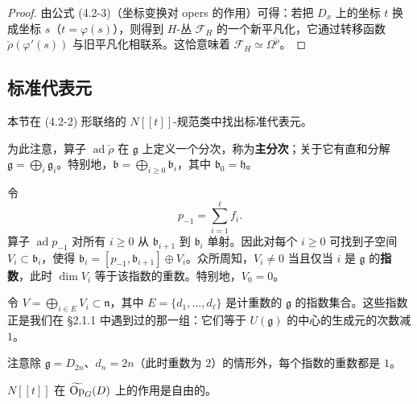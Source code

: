 \begin{proof}
由公式 (4.2-3)（坐标变换对 opers 的作用）可得：若把 $D_x$ 上的坐标 $t$ 换成坐标 $s$（$t=\varphi(s)$），则得到 $H$-丛 $\mathcal{F}_H$ 的一个新平凡化，它通过转移函数 $\check{\rho}(\varphi'(s))$ 与旧平凡化相联系。这恰意味着 $\mathcal{F}_H\simeq\Omega^{\check{\rho}}$。
\end{proof}

\subsection{标准代表元}

本节在 (4.2-2) 形联络的 $N[[t]]$-规范类中找出标准代表元。

为此注意，算子 $\operatorname{ad}\check{\rho}$ 在 $\mathfrak{g}$ 上定义一个分次，称为\textbf{主分次}；关于它有直和分解 $\mathfrak{g}=\bigoplus_i\mathfrak{g}_i$。特别地，$\mathfrak{b}=\bigoplus_{i\ge0}\mathfrak{b}_i$，其中 $\mathfrak{b}_0=\mathfrak{h}$。

令
\[
    p_{-1}=\sum_{i=1}^{\ell}f_i.
\]
算子 $\operatorname{ad}p_{-1}$ 对所有 $i\ge0$ 从 $\mathfrak{b}_{i+1}$ 到 $\mathfrak{b}_i$ 单射。因此对每个 $i\ge0$ 可找到子空间 $V_i\subset\mathfrak{b}_i$，使得 $\mathfrak{b}_i=[p_{-1},\mathfrak{b}_{i+1}]\oplus V_i$。众所周知，$V_i\ne0$ 当且仅当 $i$ 是 $\mathfrak{g}$ 的\textbf{指数}，此时 $\dim V_i$ 等于该指数的重数。特别地，$V_0=0$。

令 $V=\bigoplus_{i\in E}V_i\subset\mathfrak{n}$，其中 $E=\{d_1,\dots,d_\ell\}$ 是计重数的 $\mathfrak{g}$ 的指数集合。这些指数正是我们在 §2.1.1 中遇到过的那一组：它们等于 $U(\mathfrak{g})$ 的中心的生成元的次数减 $1$。

注意除 $\mathfrak{g}=D_{2n}$、$d_n=2n$（此时重数为 $2$）的情形外，每个指数的重数都是 $1$。

\begin{lemma}
    $N[[t]]$ 在 $\widetilde{\operatorname{Op}}_G(D)$ 上的作用是自由的。
\end{lemma}

